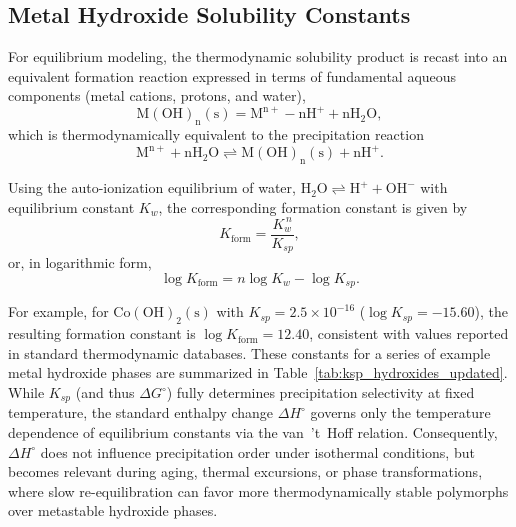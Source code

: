 \documentclass[final,2p,times]{elsarticle}
\begin{document}
\subsection{Metal Hydroxide Solubility Constants}



For equilibrium modeling, the thermodynamic solubility product is recast into an equivalent formation reaction expressed in terms of fundamental aqueous components (metal cations, protons, and water),
\begin{equation}
\mathrm{M(OH)_n(s) = M^{n+} - nH^+ + nH_2O},
\end{equation}
which is thermodynamically equivalent to the precipitation reaction
\begin{equation}
\mathrm{M^{n+} + nH_2O \rightleftharpoons M(OH)_n(s) + nH^+}.
\end{equation}

Using the auto-ionization equilibrium of water, $\mathrm{H_2O \rightleftharpoons H^+ + OH^-}$ with equilibrium constant $K_w$, the corresponding formation constant is given by
\begin{equation}
K_{\mathrm{form}} = \frac{K_w^{\,n}}{K_{sp}},
\end{equation}
or, in logarithmic form,
\begin{equation}
\log K_{\mathrm{form}} = n \log K_w - \log K_{sp}.
\end{equation}

For example, for $\mathrm{Co(OH)_2(s)}$ with $K_{sp}=2.5\times10^{-16}$ ($\log K_{sp}=-15.60$), the resulting formation constant is $\log K_{\mathrm{form}}=12.40$, consistent with values reported in standard thermodynamic databases. These constants for a series of example metal hydroxide phases are summarized in Table~\ref{tab:ksp_hydroxides_updated}. While $K_{sp}$ (and thus $\Delta G^\circ$) fully determines precipitation selectivity at fixed temperature, the standard enthalpy change $\Delta H^\circ$ governs only the temperature dependence of equilibrium constants via the van~’t~Hoff relation. Consequently, $\Delta H^\circ$ does not influence precipitation order under isothermal conditions, but becomes relevant during aging, thermal excursions, or phase transformations, where slow re-equilibration can favor more thermodynamically stable polymorphs over metastable hydroxide phases.


\renewcommand{\thetable}{A\arabic{table}}
\setcounter{table}{0}
\end{document}
